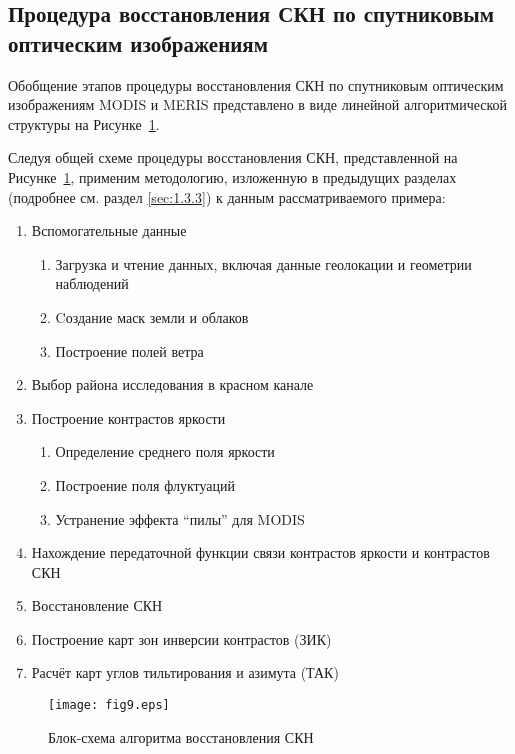 \subsection{Процедура восстановления СКН по спутниковым оптическим изображениям}

Обобщение этапов процедуры восстановления СКН по спутниковым оптическим изображениям MODIS и MERIS представлено в виде линейной алгоритмической структуры на Рисунке~\ref{fig:9}.


Следуя общей схеме процедуры восстановления СКН, представленной на Рисунке~\ref{fig:9}, применим методологию, изложенную в предыдущих разделах (подробнее см. раздел \ref{sec:1.3.3}) к данным рассматриваемого примера:

\begin{enumerate}
\item Вспомогательные данные
	\begin{enumerate}
		\item Загрузка и чтение данных, включая данные геолокации и геометрии наблюдений
		\item Cоздание маск земли и облаков
		\item Построение полей ветра
	\end{enumerate}	 
\item Выбор района исследования в красном канале
\item Построение контрастов яркости
	\begin{enumerate}
		\item Определение среднего поля яркости
		\item Построение поля флуктуаций
		\item Устранение эффекта ``пилы'' для MODIS
	\end{enumerate}	 
\item Нахождение передаточной функции связи контрастов яркости и контрастов СКН
\item Восстановление СКН
\item Построение карт зон инверсии контрастов (ЗИК)
\item Расчёт карт углов тильтирования и азимута (ТАК)
\end{enumerate}



\begin{figure}[H]
    \texttt{[image: fig9.eps]}
    \caption{Блок-схема алгоритма восстановления СКН}
    \label{fig:9}
\end{figure}



